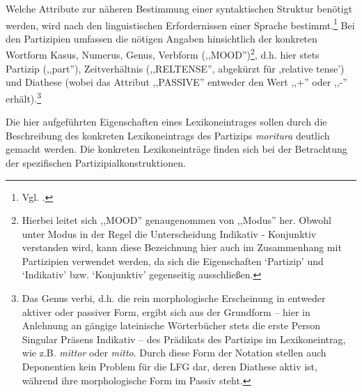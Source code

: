 \documentclass[12pt,a4paper]{article}
\begin{document}
Welche Attribute zur näheren Bestimmung einer syntaktischen Struktur benötigt werden, wird nach den linguistischen Erfordernissen einer Sprache bestimmt.\footnote{Vgl. \cite[8]{Skript}.} Bei den Partizipien umfassen die nötigen Angaben hinsichtlich der konkreten Wortform Kasus, Numerus, Genus, Verbform (,,MOOD'')\footnote{Hierbei leitet sich ,,MOOD'' genaugenommen von ,,Modus'' her. Obwohl unter Modus in der Regel die Unterscheidung Indikativ - Konjunktiv verstanden wird, kann diese Bezeichnung hier auch im Zusammenhang mit Partizipien verwendet werden, da sich die Eigenschaften `Partizip' und `Indikativ' bzw. `Konjunktiv' gegenseitig ausschließen.}, d.h. hier stets Partizip (,,part''), Zeitverhältnis (,,RELTENSE'', abgekürzt für ,relative tense') und Diathese (wobei das Attribut ,,PASSIVE'' entweder den Wert ,,+'' oder ,,-'' erhält).\footnote{Das Genus verbi, d.h. die rein morphologische Erscheinung in entweder aktiver oder passiver Form, ergibt sich aus der Grundform -- hier in Anlehnung an gängige lateinische Wörterbücher stets die erste Person Singular Präsens Indikativ -- des Prädikats des Partizips im Lexikoneintrag, wie z.B. \textit{mittor} oder \textit{mitto}. Durch diese Form der Notation stellen auch Deponentien kein Problem für die LFG dar, deren Diathese aktiv ist, während ihre morphologische Form im Passiv steht.}

Die hier aufgeführten Eigenschaften eines Lexikoneintrages sollen durch die Beschreibung des konkreten Lexikoneintrags des Partizips \textit{moritura} deutlich gemacht werden. Die konkreten Lexikoneinträge finden sich bei der Betrachtung der spezifischen Partizipialkonstruktionen.
\end{document}
